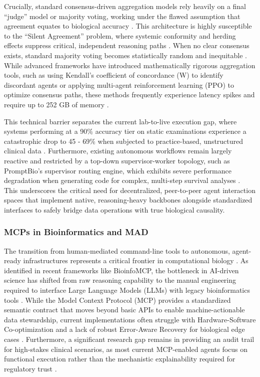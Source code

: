 \documentclass{article}
\begin{document}
Crucially, standard consensus-driven aggregation models rely heavily on a final ``judge'' model or majority voting, working under the flawed assumption that agreement equates to biological accuracy \cite{cui2025freemad}. This architecture is highly susceptible to the ``Silent Agreement'' problem, where systemic conformity and herding effects suppress critical, independent reasoning paths \cite{cui2025freemad}. When no clear consensus exists, standard majority voting becomes statistically random and inequitable \cite{cui2025freemad}. While advanced frameworks have introduced mathematically rigorous aggregation tools, such as using Kendall's coefficient of concordance (W) to identify discordant agents or applying multi-agent reinforcement learning (PPO) to optimize consensus paths, these methods frequently experience latency spikes and require up to 252 GB of memory \cite{han2025multiagent}.
    
This technical barrier separates the current lab-to-live execution gap, where systems performing at a 90\% accuracy tier on static examinations experience a catastrophic drop to 45 - 69\% when subjected to practice-based, unstructured clinical data \cite{spieser2026review}. Furthermore, existing autonomous workflows remain largely reactive and restricted by a top-down supervisor-worker topology, such as PromptBio's supervisor routing engine, which exhibits severe performance degradation when generating code for complex, multi-step survival analyses \cite{yang2025application}. This underscores the critical need for decentralized, peer-to-peer agent interaction spaces that implement native, reasoning-heavy backbones alongside standardized interfaces to safely bridge data operations with true biological causality. 
 
\subsubsection{MCPs in Bioinformatics and MAD}
The transition from human-mediated command-line tools to autonomous, agent-ready infrastructures represents a critical frontier in computational biology \cite{widjaja2025bioinfomcp, flotho2026mcpmed}. As identified in recent frameworks like BioinfoMCP, the bottleneck in AI-driven science has shifted from raw reasoning capability to the manual engineering required to interface Large Language Models (LLMs) with legacy bioinformatics tools \cite{widjaja2025bioinfomcp}. While the Model Context Protocol (MCP) provides a standardized semantic contract that moves beyond basic APIs to enable machine-actionable data stewardship, current implementations often struggle with Hardware-Software Co-optimization and a lack of robust Error-Aware Recovery for biological edge cases \cite{widjaja2025bioinfomcp, flotho2026mcpmed}. Furthermore, a significant research gap remains in providing an audit trail for high-stakes clinical scenarios, as most current MCP-enabled agents focus on functional execution rather than the mechanistic explainability required for regulatory trust \cite{flotho2026mcpmed}.
  
\end{document}
